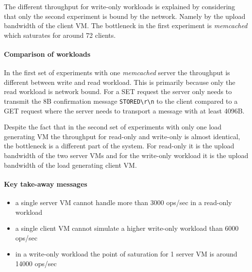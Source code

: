 \documentclass[report.tex]{subfiles}
\begin{document}
The different throughput for write-only workloads is explained by considering that only the second experiment is bound by the network. Namely by the upload bandwidth of the client VM. The bottleneck in the first experiment is \emph{memcached} which saturates for around 72 clients.

\paragraph{Comparison of workloads}
In the first set of experiments with one \emph{memcached} server the throughput is different between write and read workload. 
This is primarily because only the read workload is network bound. For a SET request the server only needs to transmit the 8B confirmation message \texttt{STORED\textbackslash r\textbackslash n} to the client compared to a GET request where the server needs to transport a message with at least 4096B. 

Despite the fact that in the second set of experiments with only one load generating VM the throughput for read-only and write-only is almost identical, the bottleneck is a different part of the system. For read-only it is the upload bandwidth of the two server VMs and for the write-only workload it is the upload bandwidth of the load generating client VM.

\paragraph{Key take-away messages}
\begin{itemize}
	\vitemsep
	\item a single server VM cannot handle more than 3000 ops/sec in a read-only workload
	\item a single client VM cannot simulate a higher write-only workload than 6000 ops/sec
	\item in a write-only workload the point of saturation for 1 server VM is around 14000 ops/sec
\end{itemize}
\end{document}
